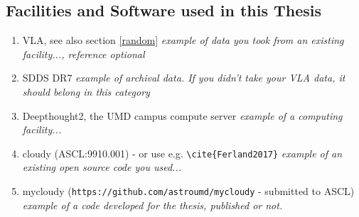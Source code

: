 %
%


\subsection{Facilities and Software used in this Thesis}

\begin{enumerate}
\item
  VLA, see also section \ref{random}
  \newline
      {\it example of data you took from an existing facility..., reference optional}
      \vspace{-1ex}

\item
  SDDS DR7
  \newline
      {\it example of archival data. If you didn't take your VLA data, it should belong in this category}
      \vspace{-1ex}

\item
  Deepthought2, the UMD campus compute server
  \newline
      {\it example of a computing facility...}
      \vspace{-1ex}
      
\item
  cloudy (ASCL:9910.001)   -  or use e.g. \verb+\cite{Ferland2017}+
  \newline
      {\it example of an existing open source code you used...}
      \vspace{-1ex}      

\item
  mycloudy (\verb+https://github.com/astroumd/mycloudy+ - submitted to ASCL)
  \newline
      {\it example of a code developed for the thesis, published or not.}
      \vspace{-1ex}      

\end{enumerate}

